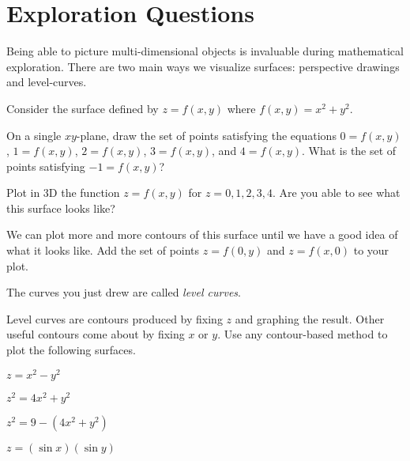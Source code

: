 \newpage
\section*{Exploration Questions}

	Being able to picture multi-dimensional objects is 
	invaluable during mathematical exploration.  There are two main ways we visualize
	surfaces: perspective drawings and level-curves.


\begin{question}
		Consider the surface defined by $z=f(x,y)$ where $f(x,y)=x^2+y^2$.
	\begin{parts}
		\item On a single $xy$-plane, draw the set of points satisfying the equations $0=f(x,y)$, $1=f(x,y)$,
			$2=f(x,y)$, $3=f(x,y)$, and $4=f(x,y)$.  What is the set of points satisfying $-1=f(x,y)$?
		\item Plot in 3D the function $z=f(x,y)$ for $z=0,1,2,3,4$.  Are you able to see what this surface looks like?
		\item We can plot more and more contours of this surface until we have a good idea of what it looks like.
			Add the set of points $z=f(0,y)$ and $z=f(x,0)$ to your plot.
	\end{parts}
\end{question}
	The curves you just drew are called \emph{level curves}.

\begin{question}
	Level curves are contours produced by fixing $z$ and graphing the result.  Other useful contours
	come about by fixing $x$ or $y$.  Use any contour-based method to plot the following surfaces.
	\begin{parts}
		\item $z=x^2-y^2$
		\item $z^2=4x^2+y^2$
		\item $z^2=9-(4x^2+y^2)$
		\item $z=(\sin x)(\sin y)$
	\end{parts}
\end{question}

